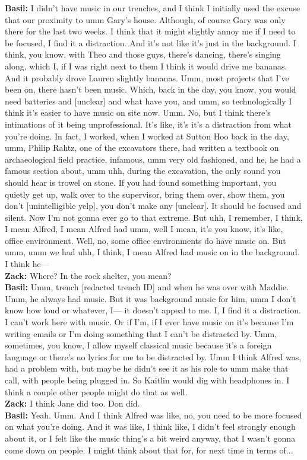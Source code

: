 \begin{arefs}
\item\label{A9}
\textbf{Basil:} I didn't have music in our trenches, and I think I initially used the excuse that our proximity to umm Gary's house. Although, of course Gary was only there for the last two weeks. I think that it might slightly annoy me if I need to be focused, I find it a distraction. And it's not like it's just in the background. I think, you know, with Theo and those guys, there's dancing, there's singing along, which I, if I was right next to them I think it would drive me bananas. And it probably drove Lauren slightly bananas. Umm, most projects that I've been on, there hasn't been music. Which, back in the day, you know, you would need batteries and [unclear] and what have you, and umm, so technologically I think it's easier to have music on site now. Umm. No, but I think there's intimations of it being unprofessional. It's like, it's it's a distraction from what you're doing. In fact, I worked, when I worked at Sutton Hoo back in the day, umm, Philip Rahtz, one of the excavators there, had written a textbook on archaeological field practice, infamous, umm very old fashioned, and he, he had a famous section about, umm uhh, during the excavation, the only sound you should hear is trowel on stone. If you had found something important, you quietly get up, walk over to the supervisor, bring them over, show them, you don't [unintelligible yelp], you don't make any [unclear]. It should be focused and silent. Now I'm not gonna ever go to that extreme. But uhh, I remember, I think, I mean Alfred, I mean Alfred had umm, well I mean, it's you know, it's like, office environment. Well, no, some office environments do have music on. But umm, umm we had uhh, I think, I mean Alfred had music on in the background. I think he—\\
\textbf{Zack:} Where? In the rock shelter, you mean?\\
\textbf{Basil:} Umm, trench [redacted trench ID] and when he was over with Maddie. Umm, he always had music. But it was background music for him, umm I don't know how loud or whatever, I— it doesn't appeal to me. I, I find it a distraction. I can't work here with music. Or if I'm, if I ever have music on it's because I'm writing emails or I'm doing something that I can't be distracted by. Umm, sometimes, you know, I allow myself classical music because it's a foreign language or there's no lyrics for me to be distracted by. Umm I think Alfred was, had a problem with, but maybe he didn't see it as his role to umm make that call, with people being plugged in. So Kaitlin would dig with headphones in. I think a couple other people might do that as well.\\
\textbf{Zack:} I think Jane did too. Don did.\\
\textbf{Basil:} Yeah. Umm. And I think Alfred was like, no, you need to be more focused on what you're doing. And it was like, I think like, I didn't feel strongly enough about it, or I felt like the music thing's a bit weird anyway, that I wasn't gonna come down on people. I might think about that for, for next time in terms of...


\end{arefs}
